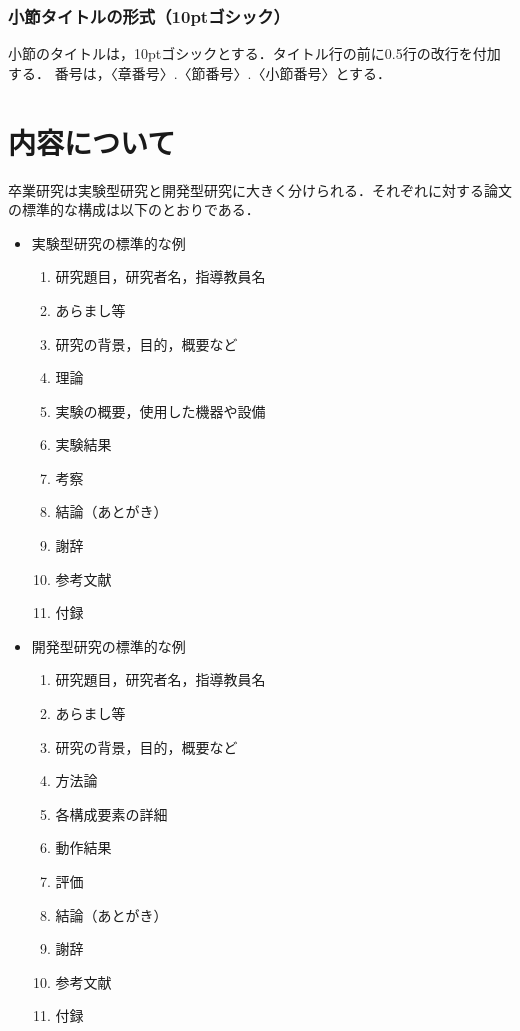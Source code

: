 \documentclass[twocolumn,fleqn]{jsarticle}
\begin{document}
\subsubsection{小節タイトルの形式（10ptゴシック）}
小節のタイトルは，10ptゴシックとする．タイトル行の前に0.5行の改行を付加する．
番号は，〈章番号〉.〈節番号〉.〈小節番号〉とする．

\section{内容について}
卒業研究は実験型研究と開発型研究に大きく分けられる．それぞれに対する論文の標準的な構成は以下のとおりである．

\begin{itemize}
\item 実験型研究の標準的な例
\begin{enumerate}
\item 研究題目，研究者名，指導教員名
\item あらまし等
\item 研究の背景，目的，概要など
\item 理論
\item 実験の概要，使用した機器や設備
\item 実験結果
\item 考察
\item 結論（あとがき）
\item 謝辞
\item 参考文献
\item 付録
\end{enumerate}
\item 開発型研究の標準的な例
\begin{enumerate}
\item 研究題目，研究者名，指導教員名
\item あらまし等
\item 研究の背景，目的，概要など
\item 方法論
\item 各構成要素の詳細
\item 動作結果
\item 評価
\item 結論（あとがき）
\item 謝辞
\item 参考文献
\item 付録
\end{enumerate}
\end{itemize}

%
\end{document}
